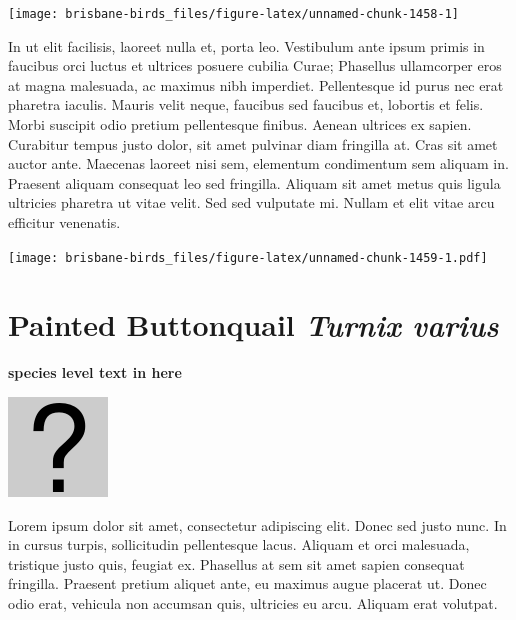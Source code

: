 \documentclass[]{book}
\let\origfigure\figure
\let\endorigfigure\endfigure
\renewenvironment{figure}[1][2] {
  \expandafter\origfigure\expandafter[H]
} {
  \endorigfigure
}
\begin{document}
\begin{figure}
\texttt{[image: brisbane-birds\_files/figure-latex/unnamed-chunk-1458-1]} \caption{insert figure caption}\label{fig:unnamed-chunk-1458}
\end{figure}

In ut elit facilisis, laoreet nulla et, porta leo. Vestibulum ante ipsum
primis in faucibus orci luctus et ultrices posuere cubilia Curae;
Phasellus ullamcorper eros at magna malesuada, ac maximus nibh
imperdiet. Pellentesque id purus nec erat pharetra iaculis. Mauris velit
neque, faucibus sed faucibus et, lobortis et felis. Morbi suscipit odio
pretium pellentesque finibus. Aenean ultrices ex sapien. Curabitur
tempus justo dolor, sit amet pulvinar diam fringilla at. Cras sit amet
auctor ante. Maecenas laoreet nisi sem, elementum condimentum sem
aliquam in. Praesent aliquam consequat leo sed fringilla. Aliquam sit
amet metus quis ligula ultricies pharetra ut vitae velit. Sed sed
vulputate mi. Nullam et elit vitae arcu efficitur venenatis.

\begin{figure}
\centering
\texttt{[image: brisbane-birds\_files/figure-latex/unnamed-chunk-1459-1.pdf]}
\caption{\label{fig:unnamed-chunk-1459}insert figure caption}
\end{figure}

\section{\texorpdfstring{Painted Buttonquail \emph{Turnix
varius}}{Painted Buttonquail Turnix varius}}\label{painted-buttonquail-turnix-varius}

\textbf{species level text in here}

\begin{figure}
\centering
\includegraphics{assets/missing.png}
\caption{No image for species}
\end{figure}

Lorem ipsum dolor sit amet, consectetur adipiscing elit. Donec sed justo
nunc. In in cursus turpis, sollicitudin pellentesque lacus. Aliquam et
orci malesuada, tristique justo quis, feugiat ex. Phasellus at sem sit
amet sapien consequat fringilla. Praesent pretium aliquet ante, eu
maximus augue placerat ut. Donec odio erat, vehicula non accumsan quis,
ultricies eu arcu. Aliquam erat volutpat.
\end{document}
